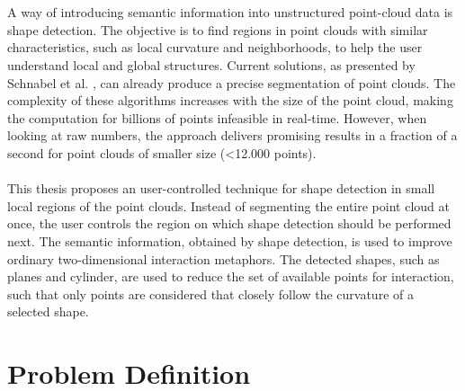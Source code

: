 \\
\\
A way of introducing semantic information into unstructured point-cloud data is shape detection. The objective is to find regions in point clouds with similar characteristics, such as local curvature and neighborhoods, to help the user understand local and global structures. Current solutions, as presented by Schnabel et al. \cite{schnabel-2007-efficient, schnabel-2007-ransac}, can already produce a precise segmentation of point clouds. The complexity of these algorithms increases with the size of the point cloud, making the computation for billions of points infeasible in real-time. However, when looking at raw numbers, the approach delivers promising results in a fraction of a second for point clouds of smaller size (<12.000 points).
\\
\\
This thesis proposes an user-controlled technique for shape detection in small local regions of the point clouds. Instead of segmenting the entire point cloud at once, the user controls the region on which shape detection should be performed next. 
The semantic information, obtained by shape detection, is used to improve ordinary two-dimensional interaction metaphors. The detected shapes, such as planes and cylinder, are used to reduce the set of available points for interaction, such that only points are considered that closely follow the curvature of a selected shape.  


\section{Problem Definition}

